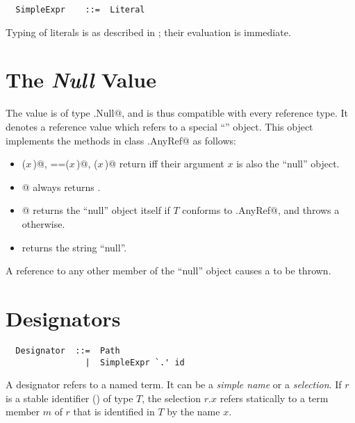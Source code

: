 \syntax\begin{lstlisting}
  SimpleExpr    ::=  Literal
\end{lstlisting}

Typing of literals is as described in ; their
evaluation is immediate.

\section{The {\em Null} Value}

The  value is of type \lstinline@scala.Null@, and is thus
compatible with every reference type.  It denotes a reference value
which refers to a special ``\lstinline@null@'' object. This object
implements the methods in class \lstinline@scala.AnyRef@ as follows:
\begin{itemize}
\item
\lstinline@eq($x\,$)@, \lstinline@==($x\,$)@, \lstinline@equals($x\,$)@ return  iff their
argument $x$ is also the ``null'' object.
\item
\lstinline@isInstanceOf[$T\,$]@ always returns .
\item
\lstinline@asInstanceOf[$T\,$]@ returns the ``null'' object itself if
$T$ conforms to \lstinline@scala.AnyRef@, and throws a
\lstinline@NullPointerException@ otherwise.
\item
{} returns the string ``null''.
\end{itemize}
A reference to any other member of the ``null'' object causes a
 to be thrown. 

\section{Designators}
\label{sec:designators}

\syntax\begin{lstlisting}
  Designator  ::=  Path
                |  SimpleExpr `.' id
\end{lstlisting}

A designator refers to a named term. It can be a {\em simple name} or
a {\em selection}. If $r$ is a stable identifier
() of type $T$, the selection $r.x$ refers
statically to a term member $m$ of $r$ that is identified in $T$ by
the name $x$.   


